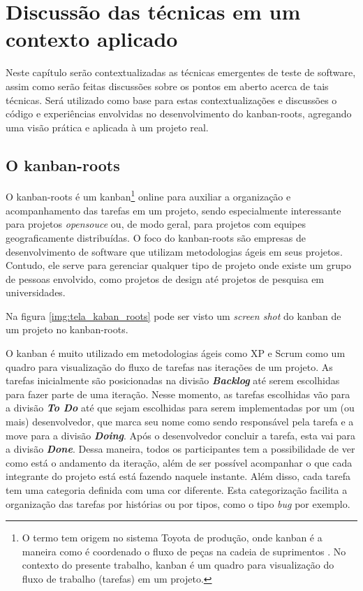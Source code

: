   \chapter{Discussão das técnicas em um contexto aplicado}

Neste capítulo serão contextualizadas as técnicas emergentes de teste de software, assim como serão feitas discussões sobre os pontos em aberto acerca de tais técnicas. Será utilizado como base para estas contextualizações e discussões o código e experiências envolvidas no desenvolvimento do kanban-roots, agregando uma visão prática e aplicada à um projeto real.

\section{O kanban-roots}
\label{sec:kanban_roots}

O kanban-roots é um kanban\footnote{O termo tem origem no sistema Toyota de produção, onde kanban é a maneira como é coordenado o fluxo de peças na cadeia de suprimentos  \cite{AMaquinaQueMudouOMundo}. No contexto do presente trabalho, kanban é um quadro para visualização do fluxo de trabalho (tarefas) em um projeto.} online para auxiliar a organização e acompanhamento das tarefas em um projeto, sendo especialmente interessante para projetos \textit{opensouce} ou, de modo geral, para projetos com equipes geograficamente distribuídas. O foco do kanban-roots são empresas de desenvolvimento de software que utilizam metodologias ágeis em seus projetos. Contudo, ele serve para gerenciar qualquer tipo de projeto onde existe um grupo de pessoas envolvido, como projetos de design até projetos de pesquisa em universidades.

Na figura \ref{img:tela_kaban_roots} pode ser visto um \textit{screen shot} do kanban de um projeto no kanban-roots.

O kanban é muito utilizado em metodologias ágeis como XP e Scrum como um quadro para visualização do fluxo de tarefas nas iterações de um projeto. As tarefas inicialmente são posicionadas na divisão \textbf{\textit{Backlog}} até serem escolhidas para fazer parte de uma iteração. Nesse momento, as tarefas escolhidas vão para a divisão \textbf{\textit{To Do}} até que sejam escolhidas para serem implementadas por um (ou mais) desenvolvedor, que marca seu nome como sendo responsável pela tarefa e a move para a divisão \textbf{\textit{Doing}}. Após o desenvolvedor concluir a tarefa, esta vai para a divisão \textbf{\textit{Done}}. Dessa maneira, todos os participantes tem a possibilidade de ver como está o andamento da iteração, além de ser possível acompanhar o que cada integrante do projeto está está fazendo naquele instante. Além disso, cada tarefa tem uma categoria definida com uma cor diferente. Esta categorização facilita a organização das tarefas por histórias ou por tipos, como o tipo \textit{bug} por exemplo.

